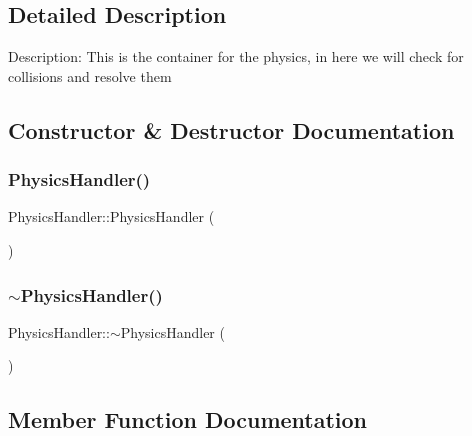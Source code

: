 \subsection{Detailed Description}
Description\+: This is the container for the physics, in here we will check for collisions and resolve them 

\subsection{Constructor \& Destructor Documentation}
\mbox{\label{class_physics_handler_a8107082a913d552fc7e513eced1e2765}} 
\subsubsection{\texorpdfstring{PhysicsHandler()}{PhysicsHandler()}}
{\footnotesize\ttfamily Physics\+Handler\+::\+Physics\+Handler (\begin{DoxyParamCaption}{ }\end{DoxyParamCaption})}

\mbox{\label{class_physics_handler_ac58b90a4a8c5e83624547946b5f47725}} 
\subsubsection{\texorpdfstring{$\sim$PhysicsHandler()}{~PhysicsHandler()}}
{\footnotesize\ttfamily Physics\+Handler\+::$\sim$\+Physics\+Handler (\begin{DoxyParamCaption}{ }\end{DoxyParamCaption})}



\subsection{Member Function Documentation}
\mbox{\label{class_physics_handler_a6e468ad8e5d6f5c5a895ea76a107333f}} 
